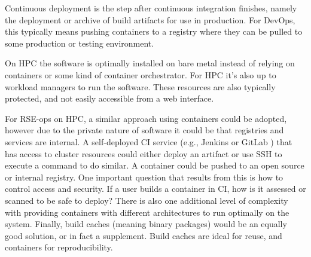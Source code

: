 Continuous deployment is the step after continuous integration finishes, namely
the deployment or archive of build artifacts for use in production.  For
DevOps, this typically means pushing containers to a registry where they can be
pulled to some production or testing environment.

On HPC the software is optimally installed on bare metal instead of relying on
containers or some kind of container orchestrator. For HPC it's also up to
workload managers \cite{slurm,flux} to run the software. These resources are
also typically protected, and not easily accessible from a web interface.

For RSE-ops on HPC, a similar approach using containers could be adopted,
however due to the private nature of software it could be that registries and
services are internal. A self-deployed CI service (e.g., Jenkins or GitLab
\cite{jenkins,gitlab}) that has access to cluster resources could either deploy
an artifact or use SSH to execute a command to do similar. A container could be
pushed to an open source or internal registry. One important question that
results from this is how to control access and security. If a user builds a
container in CI, how is it assessed or scanned to be safe to deploy?  There is
also one additional level of complexity with providing containers with
different architectures to run optimally on the system. Finally, build caches
(meaning binary packages) would be an equally good solution, or in fact a
supplement. Build caches are ideal for reuse, and containers for
reproducibility.
